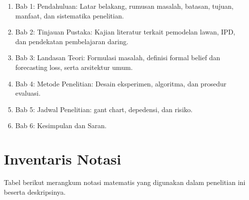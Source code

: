 \begin{enumerate}
    \item Bab 1: Pendahuluan: Latar belakang, rumusan masalah, batasan, tujuan, manfaat, dan sistematika penelitian.
    \item Bab 2: Tinjauan Pustaka: Kajian literatur terkait pemodelan lawan, IPD, dan pendekatan pembelajaran daring.
    \item Bab 3: Landasan Teori: Formulasi masalah, definisi formal belief dan forecasting loss, serta arsitektur umum.
    \item Bab 4: Metode Penelitian: Desain eksperimen, algoritma, dan prosedur evaluasi.
    \item Bab 5: Jadwal Penelitian: gant chart, depedensi, dan risiko.
    \item Bab 6: Kesimpulan dan Saran.
\end{enumerate}

\section{Inventaris Notasi}

Tabel berikut merangkum notasi matematis yang digunakan dalam penelitian ini beserta deskripsinya.

